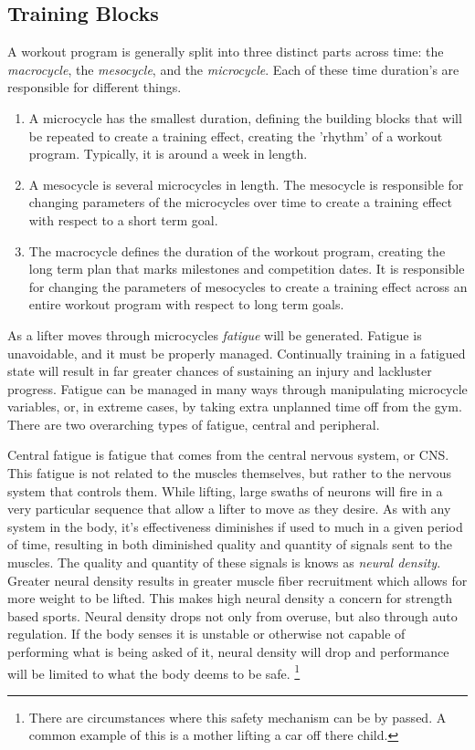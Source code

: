 \subsection{Training Blocks}
\label{sec:TrainingBlocks}

A workout program is generally split into three distinct parts across time: the \textit{macrocycle}, the \textit{mesocycle}, and the \textit{microcycle}. Each of these time duration's are responsible for different things.

\begin{enumerate}
	\item A microcycle has the smallest duration, defining the building blocks that will be repeated to create a training effect, creating the 'rhythm' of a workout program. Typically, it is around  a week in length. 
	\item A mesocycle is several microcycles in length. The mesocycle is responsible for changing parameters of the microcycles over time to create a training effect with respect to a short term goal.
	\item The macrocycle defines the duration of the workout program, creating the long term plan that marks milestones and competition dates. It is responsible for changing the parameters of mesocycles to create a training effect across an entire workout program with respect to long term goals.
\end{enumerate}

As a lifter moves through microcycles \textit{fatigue} will be generated. Fatigue is unavoidable, and it must be properly managed. Continually training in a fatigued state will result in far greater chances of sustaining an injury and lackluster progress. \cite{FATIGUE} Fatigue can be managed in many ways through manipulating microcycle variables, or, in extreme cases, by taking extra unplanned time off from the gym. There are two overarching types of fatigue, central and peripheral.\cite{MEASURING_FATIGUE}

Central fatigue is fatigue that comes from the central nervous system, or CNS. This fatigue is not related to the muscles themselves, but rather to the nervous system that controls them. While lifting, large swaths of neurons will fire in a very particular sequence that allow a lifter to move as they desire. As with any system in the body, it's effectiveness diminishes if used to much in a given period of time, resulting in both diminished quality and quantity of signals sent to the muscles. The quality and quantity of these signals is knows as \textit{neural density}. Greater neural density results in greater muscle fiber recruitment which allows for more weight to be lifted. This makes high neural density a concern for strength based sports. Neural density drops not only from overuse, but also through auto regulation. If the body senses it is unstable or otherwise not capable of performing what is being asked of it, neural density will drop and performance will be limited to what the body deems to be safe. \footnote{There are circumstances where this safety mechanism can be by passed. A common example of this is a mother lifting a car off there child.} \cite{MEASURING_FATIGUE}

